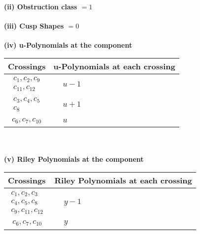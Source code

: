 \documentclass[1p]{elsarticle_modified}
\theoremstyle{definition}
\begin{document}
\flushleft \textbf{(ii) Obstruction class $= 1$}\\~\\
\flushleft \textbf{(iii) Cusp Shapes $= 0$}\\~\\
\newpage\renewcommand{\arraystretch}{1}
\flushleft \textbf{(iv) u-Polynomials at the component}\newline \\
\begin{tabular}{m{50pt}|m{274pt}}
Crossings & \hspace{64pt}u-Polynomials at each crossing \\
\hline $$\begin{aligned}c_{1},c_{2},c_{9}\\c_{11},c_{12}\end{aligned}$$&$\begin{aligned}
&u-1
\end{aligned}$\\
\hline $$\begin{aligned}c_{3},c_{4},c_{5}\\c_{8}\end{aligned}$$&$\begin{aligned}
&u+1
\end{aligned}$\\
\hline $$\begin{aligned}c_{6},c_{7},c_{10}\end{aligned}$$&$\begin{aligned}
&u
\end{aligned}$\\
\hline
\end{tabular}\\~\\
\newpage\renewcommand{\arraystretch}{1}
\flushleft \textbf{(v) Riley Polynomials at the component}\newline \\
\begin{tabular}{m{50pt}|m{274pt}}
Crossings & \hspace{64pt}Riley Polynomials at each crossing \\
\hline $$\begin{aligned}c_{1},c_{2},c_{3}\\c_{4},c_{5},c_{8}\\c_{9},c_{11},c_{12}\end{aligned}$$&$\begin{aligned}
&y-1
\end{aligned}$\\
\hline $$\begin{aligned}c_{6},c_{7},c_{10}\end{aligned}$$&$\begin{aligned}
&y
\end{aligned}$\\
\hline
\end{tabular}\\~\\
\end{document}
